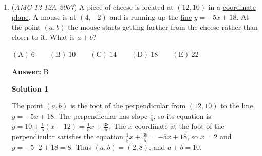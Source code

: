 \begin{enumerate}
 



\textbf{Solution 2 (casework)}

If we don't know our parity rules, we can check and see that $ad-bc$ is only even when $ad$ and $bc$ are of the same \href{https://artofproblemsolving.com/wiki/index.php?title=Parity}{parity} (as stated above). From here, we have two cases.

 Case 1: $odd-odd$ (which must be $o \cdot o-o \cdot o$). The probability for this to occur is $\left(\frac 12\right)^4 = \frac 1{16}$, because each integer has a $\frac 12$ chance of being odd.

 Case 2: $even-even$ (which occurs in 4 cases: $(e \cdot e-e \cdot e$), ($o \cdot e-o \cdot e$) (alternating of any kind), and ($e \cdot e-o \cdot e$) with its reverse, ($o \cdot e-e \cdot e$).

 Our first subcase of case 2 has a chance of $\frac 1{16}$ (same reasoning as above).

 Our second subcase of case 2 has a $\frac 14$ chance, since only the 2nd and 4th flip matter (or 1st and 3rd).

 Our third subcase of case 2 has a $\frac 18$ chance, because the 1st, 2nd, and either 3rd or 4th flip matter.

 Our fourth subcase of case 2 has a $\frac 18$ chance, because it's the same, just reversed.

 We sum these, and get our answer of $\frac 1{16} + \frac 1{16} + \frac 14 + \frac 18 + \frac 18 = \boxed {\mathrm{(E )} \frac 58\ }.$



	\item (\textit{AMC 12 12A 2007}) A piece of cheese is located at $(12,10)$ in a \href{https://artofproblemsolving.com/wiki/index.php?title=Coordinate\_plane}{coordinate plane}. A mouse is at $(4,-2)$ and is running up the \href{https://artofproblemsolving.com/wiki/index.php?title=Line}{line} $y=-5x+18$. At the point $(a,b)$ the mouse starts getting farther from the cheese rather than closer to it. What is  $a+b$?


 $\mathrm{(A)}\ 6\qquad \mathrm{(B)}\ 10\qquad \mathrm{(C)}\ 14\qquad \mathrm{(D)}\ 18\qquad \mathrm{(E)}\ 22$

 \textbf{Answer: }B



\textbf{Solution 1}

The point $(a,b)$ is the foot of the perpendicular from $(12,10)$ to the line $y=-5x+18$. The perpendicular has slope $\frac{1}{5}$, so its equation is $y=10+\frac{1}{5}(x-12)=\frac{1}{5}x+\frac{38}{5}$. The $x$-coordinate at the foot of the perpendicular satisfies the equation $\frac{1}{5}x+\frac{38}{5}=-5x+18$, so $x=2$ and $y=-5\cdot2+18=8$. Thus $(a,b) = (2,8)$, and $a+b = \boxed{10}$.


\end{enumerate}
